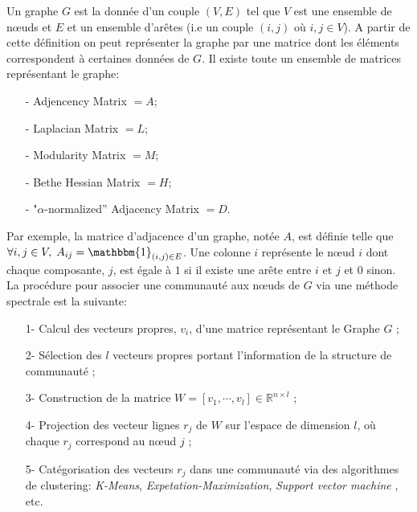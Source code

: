 Un graphe $G$ est la donnée d'un couple $(V, E)$ tel que $V$ est une ensemble de nœuds et $E$ et un ensemble d'arêtes (i.e un couple $(i,j)$ où $i,j \in V$).
A partir de cette définition on peut représenter la graphe par une matrice dont les éléments correspondent à certaines données de $G$.
Il existe toute un ensemble de matrices représentant le graphe:
\begin{itemize}
  	\item[-]  Adjencency Matrix $= A$;
  	\item[-]  Laplacian Matrix $= L$;
  	\item[-]  Modularity Matrix $= M$;
  	\item[-]  Bethe Hessian Matrix $= H$;
  	\item[-]  "$\alpha$-normalized” Adjacency Matrix $= D$.\\
\end{itemize}
Par exemple, la matrice d'adjacence d'un graphe, notée $A$, est définie telle que $\forall i,j \in V, \; A_{ij} = \mathbbm{1}_{(i,j) \in E}$.
Une colonne $i$ représente le nœud $i$ dont chaque composante, $j$, est égale à $1$ si il existe une arête entre $i$ et $j$ et $0$ sinon.\\
La procédure pour associer une communauté aux nœuds de $G$ via une méthode spectrale est la suivante: 
\begin{itemize}
	\item[1-] Calcul des vecteurs propres, $v_i$, d'une matrice représentant le Graphe $G$ ;
	\item[2-] Sélection des $l$ vecteurs propres portant l'information de la structure de communauté ; 
	\item[3-] Construction de la matrice $W = [v_1, \cdots, v_l] \in \mathbb{R}^{n\times l}$ ; 
	\item[4-] Projection des vecteur lignes $r_j$ de $W$ sur l'espace de dimension $l$, où chaque $r_j$ correspond  au nœud $j$ ; 
	\item[5-] Catégorisation des vecteurs $r_j $ dans une communauté via des algorithmes de clustering: \textit{K-Means}, \textit{Expetation-Maximization}, \textit{Support vector machine }, etc.\\
\end{itemize}

